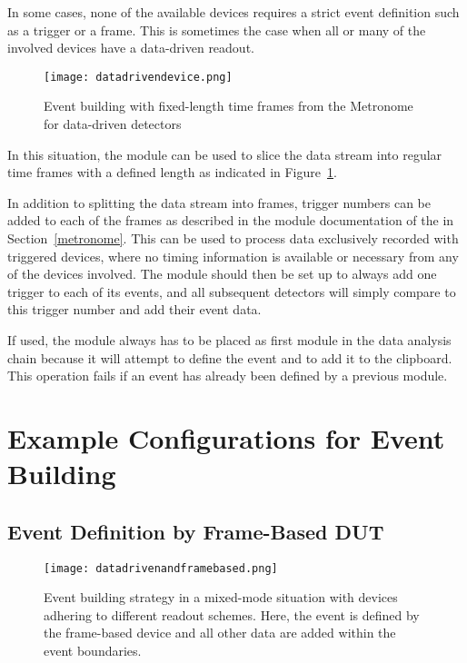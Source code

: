 In some cases, none of the available devices requires a strict event definition such as a trigger or a frame.
This is sometimes the case when all or many of the involved devices have a data-driven readout.

\begin{figure}[tbp]
        \centering
        \texttt{[image: datadrivendevice.png]}
        \caption{Event building with fixed-length time frames from the Metronome for data-driven detectors}
        \label{fig:datadriven}
\end{figure}

In this situation, the  module can be used to slice the data stream into regular time frames with a defined length as indicated in Figure~\ref{fig:datadriven}.

In addition to splitting the data stream into frames, trigger numbers can be added to each of the frames as described in the module documentation of the  in Section~\ref{metronome}.
This can be used to process data exclusively recorded with triggered devices, where no timing information is available or necessary from any of the devices involved.
The module should then be set up to always add one trigger to each of its events, and all subsequent detectors will simply compare to this trigger number and add their event data.

If used, the  module always has to be placed as first module in the data analysis chain because it will attempt to define the event and to add it to the clipboard.
This operation fails if an event has already been defined by a previous module.


\section{Example Configurations for Event Building}

\subsection{Event Definition by Frame-Based DUT}
\label{sec:reco_mixedmode}
\begin{figure}[tbp]
        \centering
        \texttt{[image: datadrivenandframebased.png]}
        \caption{Event building strategy in a mixed-mode situation with devices adhering to different readout schemes. Here, the event is defined by the frame-based device and all other data are added within the event boundaries.}
        \label{fig:datadrivenandframebased}
\end{figure}

